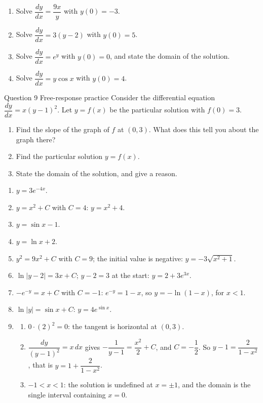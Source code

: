 \documentclass[11pt]{article}
\begin{document}
\begin{enumerate}[leftmargin=*,itemsep=2pt,start=5]
  \item Solve $\dfrac{dy}{dx}=\dfrac{9x}{y}$ with $y(0)=-3$.\work{2.8cm}
  \item Solve $\dfrac{dy}{dx}=3(y-2)$ with $y(0)=5$.\work{2.8cm}
  \item Solve $\dfrac{dy}{dx}=e^{y}$ with $y(0)=0$, and state the domain of the solution.\work{2.8cm}
  \item Solve $\dfrac{dy}{dx}=y\cos x$ with $y(0)=4$.\work{2.8cm}
\end{enumerate}

\begin{frbox}{Question 9 \textperiodcentered{} Free-response practice}
Consider the differential equation $\dfrac{dy}{dx}=x(y-1)^2$. Let $y=f(x)$ be the particular solution with $f(0)=3$.
\begin{enumerate}[label=(\alph*),leftmargin=*,itemsep=2pt]
  \item Find the slope of the graph of $f$ at $(0,3)$. What does this tell you about the graph there?\work{2.6cm}
  \item Find the particular solution $y=f(x)$.\work{2.6cm}
  \item State the domain of the solution, and give a reason.\work{2.6cm}
\end{enumerate}
\end{frbox}

\newpage
\begin{solbox}
\begin{enumerate}[leftmargin=*,itemsep=4pt]
  \item $y=3e^{-4x}$.
  \item $y=x^2+C$ with $C=4$: $y=x^2+4$.
  \item $y=\sin x-1$.
  \item $y=\ln x+2$.
  \item $y^2=9x^2+C$ with $C=9$; the initial value is negative: $y=-3\sqrt{x^2+1}$.
  \item $\ln|y-2|=3x+C$; $y-2=3$ at the start: $y=2+3e^{3x}$.
  \item $-e^{-y}=x+C$ with $C=-1$: $e^{-y}=1-x$, so $y=-\ln(1-x)$, for $x<1$.
  \item $\ln|y|=\sin x+C$: $y=4e^{\sin x}$.
  \item \begin{enumerate}[label=(\alph*),leftmargin=*,itemsep=3pt]
    \item $0\cdot(2)^2=0$: the tangent is horizontal at $(0,3)$.
    \item $\dfrac{dy}{(y-1)^2}=x\,dx$ gives $-\dfrac{1}{y-1}=\dfrac{x^2}{2}+C$, and $C=-\dfrac12$. So $y-1=\dfrac{2}{1-x^2}$, that is $y=1+\dfrac{2}{1-x^2}$.
    \item $-1<x<1$: the solution is undefined at $x=\pm1$, and the domain is the single interval containing $x=0$.
  \end{enumerate}
\end{enumerate}
\end{solbox}
\end{document}
